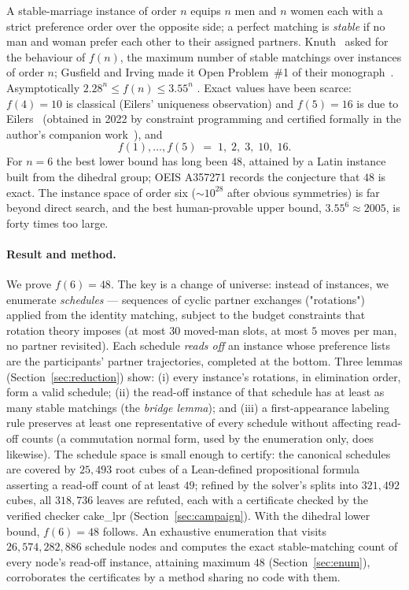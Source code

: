 \documentclass[11pt]{article}
\begin{document}
A stable-marriage instance of order $n$ equips $n$ men and $n$ women each with a strict preference
order over the opposite side; a perfect matching is \emph{stable} if no man and woman prefer each
other to their assigned partners. Knuth~\cite{knuth} asked for the behaviour of $f(n)$, the maximum
number of stable matchings over instances of order $n$; Gusfield and Irving made it Open
Problem~\#1 of their monograph~\cite{gi89}. Asymptotically $2.28^n\le f(n)\le 3.55^n$
\cite{thurber,kow,pp}. Exact values have been scarce: $f(4)=10$ is classical (Eilers'
uniqueness observation) and $f(5)=16$ is due to Eilers~\cite{oeis} (obtained in 2022 by constraint
programming and certified formally in the author's companion work~\cite{f5paper}), and
\[
f(1),\dots,f(5) \;=\; 1,\;2,\;3,\;10,\;16.
\]
For $n=6$ the best lower bound has long been $48$, attained by a Latin instance built from the
dihedral group; OEIS A357271 records the conjecture that $48$ is exact. The instance space of
order six ($\sim\!10^{28}$ after obvious symmetries) is far beyond direct search, and the best
human-provable upper bound, $3.55^6\approx 2005$, is forty times too large.

\paragraph{Result and method.} We prove $f(6)=48$. The key is a change of universe: instead of
instances, we enumerate \emph{schedules} --- sequences of cyclic partner exchanges ("rotations")
applied from the identity matching, subject to the budget constraints that rotation theory imposes
(at most $30$ moved-man slots, at most $5$ moves per man, no partner revisited). Each schedule
\emph{reads off} an instance whose preference lists are the participants' partner trajectories,
completed at the bottom. Three lemmas (Section~\ref{sec:reduction}) show:
(i) every instance's rotations, in elimination order, form a valid schedule;
(ii) the read-off instance of that schedule has at least as many stable matchings
(the \emph{bridge lemma}); and
(iii) a first-appearance labeling rule preserves at least one representative of every schedule
without affecting read-off counts (a commutation normal form, used by the enumeration only, does
likewise).
The schedule space is small enough to certify: the canonical schedules are covered by $25{,}493$
root cubes of a Lean-defined propositional formula asserting a read-off count of at least $49$;
refined by the solver's splits into $321{,}492$ cubes, all $318{,}736$ leaves are refuted, each
with a certificate checked by the verified checker cake\_lpr (Section~\ref{sec:campaign}). With the
dihedral lower bound, $f(6)=48$ follows. An exhaustive enumeration that visits
$26{,}574{,}282{,}886$ schedule nodes and computes the exact stable-matching count of every node's
read-off instance, attaining maximum $48$ (Section~\ref{sec:enum}), corroborates the certificates
by a method sharing no code with them.
\end{document}
